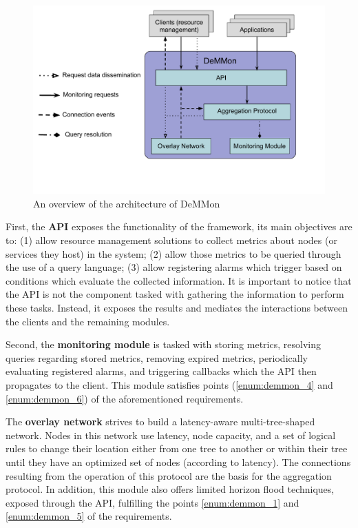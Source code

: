 \begin{figure}[htbp]
    \centering
    \includegraphics[width=\textwidth]{Chapters/Figures/DeMMon-overview.pdf}
    \caption{An overview of the architecture of DeMMon}
    \label{fig:demmon-overview}
\end{figure}
    
First, the \textbf{API} exposes the functionality of the framework, its main objectives are to: (1) allow resource management solutions to collect metrics about nodes (or services they host) in the system; (2) allow those metrics to be queried through the use of a query language; (3) allow registering alarms which trigger based on conditions which evaluate the collected information. It is important to notice that the API is not the component tasked with gathering the information to perform these tasks. Instead, it exposes the results and mediates the interactions between the clients and the remaining modules.

Second, the \textbf{monitoring module} is tasked with storing metrics, resolving queries regarding stored metrics, removing expired metrics, periodically evaluating registered alarms, and triggering callbacks which the API then propagates to the client. This module satisfies points (\ref{enum:demmon_4} and \ref{enum:demmon_6}) of the aforementioned requirements.

The \textbf{overlay network} strives to build a latency-aware multi-tree-shaped network. Nodes in this network use latency, node capacity, and a set of logical rules to change their location either from one tree to another or within their tree until they have an optimized set of nodes (according to latency). The connections resulting from the operation of this protocol are the basis for the aggregation protocol. In addition, this module also offers limited horizon flood techniques, exposed through the API, fulfilling the points \ref{enum:demmon_1} and \ref{enum:demmon_5} of the requirements.

